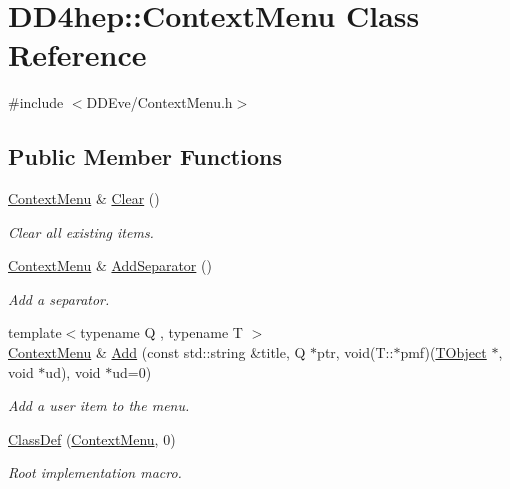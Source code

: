 \hypertarget{class_d_d4hep_1_1_context_menu}{}\section{D\+D4hep\+:\+:Context\+Menu Class Reference}
\label{class_d_d4hep_1_1_context_menu}


{\ttfamily \#include $<$D\+D\+Eve/\+Context\+Menu.\+h$>$}

\subsection*{Public Member Functions}
\begin{DoxyCompactItemize}
\item 
\hyperlink{class_d_d4hep_1_1_context_menu}{Context\+Menu} \& \hyperlink{class_d_d4hep_1_1_context_menu_a6696f7477fe601dda441f5b8f409d97d}{Clear} ()
\begin{DoxyCompactList}\small\item\em Clear all existing items. \end{DoxyCompactList}\item 
\hyperlink{class_d_d4hep_1_1_context_menu}{Context\+Menu} \& \hyperlink{class_d_d4hep_1_1_context_menu_a4f500b58c95613e4b6a05a1b31d03a99}{Add\+Separator} ()
\begin{DoxyCompactList}\small\item\em Add a separator. \end{DoxyCompactList}\item 
{\footnotesize template$<$typename Q , typename T $>$ }\\\hyperlink{class_d_d4hep_1_1_context_menu}{Context\+Menu} \& \hyperlink{class_d_d4hep_1_1_context_menu_acaf0044dc8d09c404a520598f6e1c87b}{Add} (const std\+::string \&title, Q $\ast$ptr, void(T\+::$\ast$pmf)(\hyperlink{class_t_object}{T\+Object} $\ast$, void $\ast$ud), void $\ast$ud=0)
\begin{DoxyCompactList}\small\item\em Add a user item to the menu. \end{DoxyCompactList}\item 
\hyperlink{class_d_d4hep_1_1_context_menu_a2f6ab4ffe0c386047b6922c267e0fba7}{Class\+Def} (\hyperlink{class_d_d4hep_1_1_context_menu}{Context\+Menu}, 0)
\begin{DoxyCompactList}\small\item\em Root implementation macro. \end{DoxyCompactList}\end{DoxyCompactItemize}
